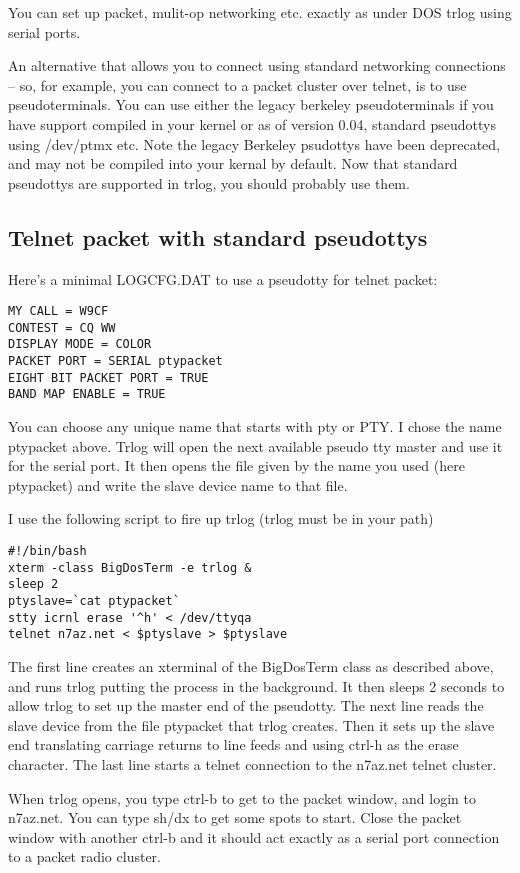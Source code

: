 \documentclass[12pt]{article}
\begin{document}
You can set up packet, mulit-op networking etc.
exactly as under DOS trlog using
serial ports.

An alternative that allows you to connect using standard networking
connections -- so, for example, you can connect to a packet cluster
over telnet, is to use pseudoterminals.
You can use either the legacy berkeley pseudoterminals if you have
support compiled in your kernel or as of
version 0.04, standard pseudottys using /dev/ptmx etc.
Note the legacy Berkeley psudottys have been deprecated, and may
not be compiled into your kernal by default.  Now that standard
pseudottys are supported in trlog, you should probably use them.

\subsection{Telnet packet with standard pseudottys}
Here's a minimal LOGCFG.DAT to use a pseudotty for telnet packet:
\begin{verbatim}
MY CALL = W9CF
CONTEST = CQ WW
DISPLAY MODE = COLOR
PACKET PORT = SERIAL ptypacket
EIGHT BIT PACKET PORT = TRUE
BAND MAP ENABLE = TRUE
\end{verbatim}

You can choose any unique name that starts with pty or PTY.  I chose
the name ptypacket above. Trlog will
open the next available pseudo tty master and use it for the serial
port. It then opens the file given by the name you used (here ptypacket)
and write the slave device name to that file.

I use the following script to fire up trlog (trlog must be in your path)
\begin{verbatim}
#!/bin/bash
xterm -class BigDosTerm -e trlog &
sleep 2
ptyslave=`cat ptypacket`
stty icrnl erase '^h' < /dev/ttyqa
telnet n7az.net < $ptyslave > $ptyslave
\end{verbatim}
The first line creates an xterminal of the BigDosTerm class as described
above, and runs trlog putting the process in the background.
It then sleeps 2 seconds to allow trlog to set up the master end of the
pseudotty. The next line reads the slave device from the
file ptypacket that trlog creates. Then it sets up the slave end translating
carriage returns to line feeds and using ctrl-h as the erase character.
The last line starts a telnet connection to the n7az.net telnet cluster.

When trlog opens, you type ctrl-b to get to the packet window, and login
to n7az.net. You can type sh/dx to get some spots to start. Close the
packet window with another ctrl-b and it should act exactly as a serial
port connection to a packet radio cluster.
\end{document}
